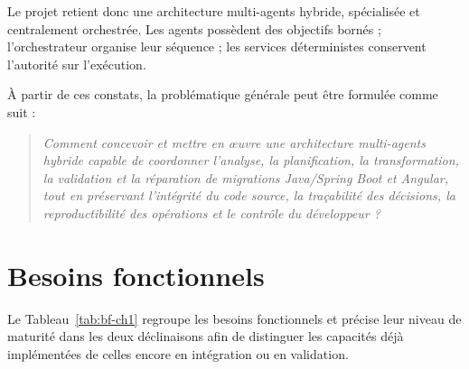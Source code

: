 Le projet retient donc une architecture multi-agents hybride, spécialisée et centralement orchestrée. Les agents possèdent des objectifs bornés ; l'orchestrateur organise leur séquence ; les services déterministes conservent l'autorité sur l'exécution.

À partir de ces constats, la problématique générale peut être formulée comme suit :

\begin{quote}
\itshape
Comment concevoir et mettre en œuvre une architecture multi-agents hybride capable de coordonner l'analyse, la planification, la transformation, la validation et la réparation de migrations Java/Spring Boot et Angular, tout en préservant l'intégrité du code source, la traçabilité des décisions, la reproductibilité des opérations et le contrôle du développeur ?
\end{quote}

\section{Besoins fonctionnels}

Le Tableau~\ref{tab:bf-ch1} regroupe les besoins fonctionnels et précise leur niveau de maturité dans les deux déclinaisons afin de distinguer les capacités déjà implémentées de celles encore en intégration ou en validation.

